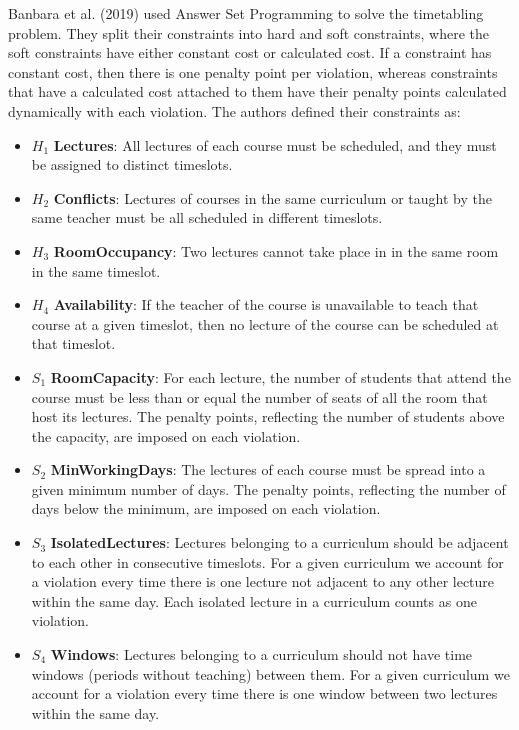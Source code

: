 Banbara et al. (2019)\cite{asp_example} used Answer Set Programming to solve the 
timetabling problem.
They split their constraints into hard and soft constraints, where the soft
constraints have either constant cost or calculated cost.
If a constraint has constant cost, then there is one penalty point per
violation, whereas constraints that have a calculated cost attached to them
have their penalty points calculated dynamically with each violation.
The authors defined their constraints as:
\begin{itemize}
	\item \( H_1 \) \textbf{Lectures}: All lectures of each course must be 
		scheduled, and they must be assigned to distinct timeslots.
	\item \( H_2 \) \textbf{Conflicts}: Lectures of courses in the same 
		curriculum or taught by the same teacher must be all scheduled in 
		different timeslots.
	\item \( H_3 \) \textbf{RoomOccupancy}: Two lectures cannot take place in 
		in the same room in the same timeslot.
	\item \( H_4 \) \textbf{Availability}: If the teacher of the course is 
		unavailable to teach that course at a given timeslot, then no lecture of
		the course can be scheduled at that timeslot.
	\item \( S_1 \) \textbf{RoomCapacity}: For each lecture, the number of
		students that attend the course must be less than or equal the number of
		seats of all the room that host its lectures.
		The penalty points, reflecting the number of students above the
		capacity, are imposed on each violation.
	\item \( S_2 \) \textbf{MinWorkingDays}: The lectures of each course must be
		spread into a given minimum number of days.
		The penalty points, reflecting the number of days below the minimum, are
		imposed on each violation.
	\item \( S_3 \) \textbf{IsolatedLectures}: Lectures belonging to a
		curriculum should be adjacent to each other in consecutive timeslots.
		For a given curriculum we account for a violation every time there is 
		one lecture not adjacent to any other lecture within the same day.
		Each isolated lecture in a curriculum counts as one violation.
	\item \( S_4 \) \textbf{Windows}: Lectures belonging to a curriculum should 
		not have time windows (periods without teaching) between them.
		For a given curriculum we account for a violation every time there is
		one window between two lectures within the same day.

\end{itemize}
